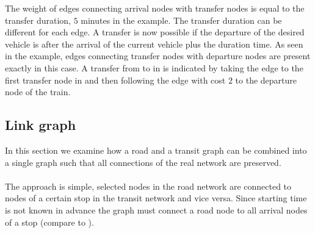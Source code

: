 	The weight of edges connecting arrival nodes with transfer nodes is equal to the transfer duration, $5$ minutes in the example.
	The transfer duration can be different for each edge. A transfer is now possible if the departure of the desired vehicle is after
	the arrival of the current vehicle plus the duration time. As seen in the example, edges connecting transfer nodes with departure
	nodes are present exactly in this case. A transfer from \ticef to \tregios in \offenburg is indicated by taking the edge to the
	first transfer node in \offenburg and then following the edge with cost $2$ to the departure node of the train.
\subsection{Link graph}\label{linkGraph_sec}
	In this section we examine how a road and a transit graph can be combined into a single graph such that all
	connections of the real network are preserved.\\\\
	The approach is simple, selected nodes in the road network are connected to nodes of a certain stop in
	the transit network and vice versa. Since starting time is not known in advance the graph must connect a
	road node to all arrival nodes of a stop (compare to ).
	
